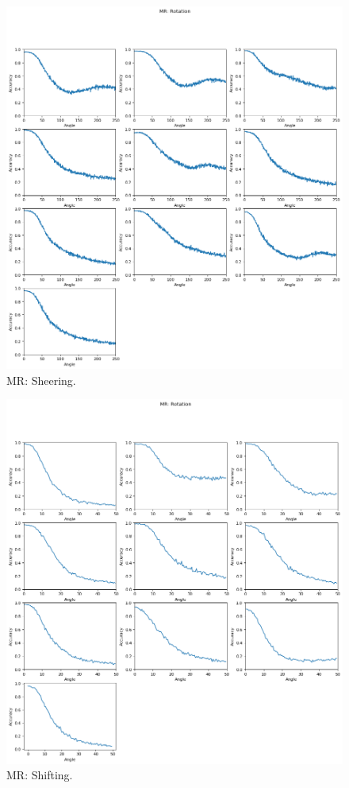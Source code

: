 \begin{figure}
  \includegraphics[width=\linewidth]{images/sheer1}
  \caption{MR: Sheering.}
  \label{fig: Sheer}
\end{figure}

\begin{figure}
  \includegraphics[width=\linewidth]{images/shift1}
  \caption{MR: Shifting.}
  \label{fig: Shift}
\end{figure}
